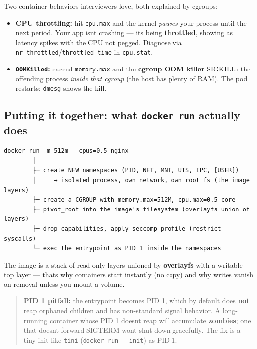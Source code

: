 \documentclass[11pt]{article}
\providecommand{\tightlist}{\setlength{\itemsep}{1pt}\setlength{\parskip}{0pt}}
\begin{document}
Two container behaviors interviewers love, both explained by cgroups:

\begin{itemize}
\tightlist
\item
  \textbf{CPU throttling:} hit \texttt{cpu.max} and the kernel \emph{pauses} your process until the next period. Your app isn\textquotesingle t crashing --- it\textquotesingle s being \textbf{throttled}, showing as latency spikes with the CPU not pegged. Diagnose via \texttt{nr\_throttled}/\texttt{throttled\_time} in \texttt{cpu.stat}.
\item
  \textbf{\texttt{OOMKilled}:} exceed \texttt{memory.max} and the \textbf{cgroup OOM killer} SIGKILLs the offending process \emph{inside that cgroup} (the host has plenty of RAM). The pod restarts; \texttt{dmesg} shows the kill.
\end{itemize}

\subsection{\texorpdfstring{Putting it together: what \texttt{docker\ run} actually does}{Putting it together: what docker run actually does}}\label{putting-it-together-what-docker-run-actually-does}

\setcodelang{}

\begin{verbatim}
docker run -m 512m --cpus=0.5 nginx
        │
        ├─ create NEW namespaces (PID, NET, MNT, UTS, IPC, [USER])
        │     → isolated process, own network, own root fs (the image layers)
        ├─ create a CGROUP with memory.max=512M, cpu.max=0.5 core
        ├─ pivot_root into the image's filesystem (overlayfs union of layers)
        ├─ drop capabilities, apply seccomp profile (restrict syscalls)
        └─ exec the entrypoint as PID 1 inside the namespaces
\end{verbatim}

The image is a stack of read-only layers unioned by \textbf{overlayfs} with a writable top layer --- that\textquotesingle s why containers start instantly (no copy) and why writes vanish on removal unless you mount a volume.

\begin{quote}
\textbf{PID 1 pitfall:} the entrypoint becomes PID 1, which by default does \textbf{not} reap orphaned children and has non-standard signal behavior. A long-running container whose PID 1 doesn\textquotesingle t reap will accumulate \textbf{zombies}; one that doesn\textquotesingle t forward SIGTERM won\textquotesingle t shut down gracefully. The fix is a tiny init like \texttt{tini} (\texttt{docker\ run\ -\/-init}) as PID 1.
\end{quote}
\end{document}
